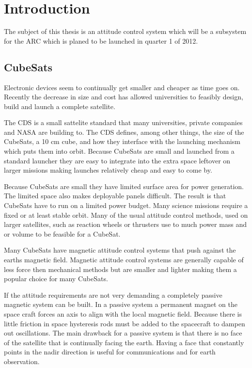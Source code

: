 
\chapter{Introduction}

The subject of this thesis is an attitude control system which will be a subsystem for the \ac{ARC} which is planed to be launched in quarter 1 of 2012.

\section{CubeSats}

Electronic devices seem to continually get smaller and cheaper as time goes on. Recently the decrease in size and cost has allowed universities to feasibly design, build and launch a complete satellite. 

The \acf{CDS} is a small sattelite standard that many universities, private companies and NASA are building to. The \ac{CDS} defines, among other things, the size of the CubeSats, a 10 cm cube, and how they interface with the launching mechanism which puts them into orbit. Because CubeSats are small and launched from a standard launcher they are easy to integrate into the extra space leftover on larger missions making launches relatively cheap and easy to come by.

Because CubeSats are small they have limited surface area for power generation. The limited space also makes deployable panels difficult. The result is that CubeSats have to run on a limited power budget. Many science missions require a fixed or at least stable orbit. Many of the usual attitude control methods, used on larger satellites, such as reaction wheels or thrusters use to much power mass and or volume to be feasible for a CubeSat.

Many CubeSats have magnetic attitude control systems that push against the earths magnetic field. Magnetic attitude control systems are generally capable of less force then mechanical methods but are smaller and lighter making them a popular choice for many CubeSats.

If the attitude requirements are not very demanding a completely passive magnetic system can be built. In a passive system a permanent magnet on the space craft forces an axis to align with the local magnetic field. Because there is little friction in space hysteresis rods must be added to the spacecraft to dampen out oscillations. The main drawback for a passive system is that there is no face of the satellite that is continually facing the earth. Having a face that constantly points in the nadir direction is useful for communications and for earth observation.

